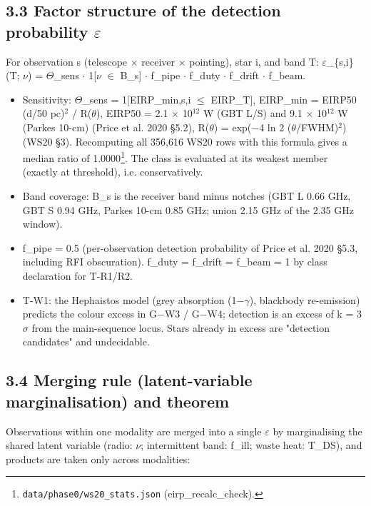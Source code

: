 \documentclass[11pt]{article}
\begin{document}
\subsection*{3.3 Factor structure of the detection probability \(\varepsilon\)}
\noindent For observation s (telescope \(\times\) receiver \(\times\) pointing), star i, and band T: \(\varepsilon\)\_\{s,i\}(T; \(\nu\)) = \(\Theta\)\_sens \(\cdot\) 1[\(\nu\) \(\in\) B\_s] \(\cdot\) f\_pipe \(\cdot\) f\_duty \(\cdot\) f\_drift \(\cdot\) f\_beam.\par\smallskip
\begin{itemize}\setlength{\itemsep}{1pt}
\item Sensitivity: \(\Theta\)\_sens = 1[EIRP\_min,s,i \(\leq\) EIRP\_T], EIRP\_min = EIRP50 (d/50 pc)\(^{2}\) / R(\(\theta\)), EIRP50 = 2.1 \(\times\) 10\(^{12}\) W (GBT L/S) and 9.1 \(\times\) 10\(^{12}\) W (Parkes 10-cm) (Price et al. 2020 \S{}5.2), R(\(\theta\)) = exp(\(-\)4 ln 2 (\(\theta\)/FWHM)\(^{2}\)) (WS20 \S{}3). Recomputing all 356,616 WS20 rows with this formula gives a median ratio of 1.0000\footnote{\texttt{data/phase0/ws20\_stats.json} (eirp\_recalc\_check).}. The class is evaluated at its weakest member (exactly at threshold), i.e. conservatively.
\item Band coverage: B\_s is the receiver band minus notches (GBT L 0.66 GHz, GBT S 0.94 GHz, Parkes 10-cm 0.85 GHz; union 2.15 GHz of the 2.35 GHz window).
\item f\_pipe = 0.5 (per-observation detection probability of Price et al. 2020 \S{}5.3, including RFI obscuration). f\_duty = f\_drift = f\_beam = 1 by class declaration for T-R1/R2.
\item T-W1: the Hephaistos model (grey absorption (1\(-\)\(\gamma\)), blackbody re-emission) predicts the colour excess in G\(-\)W3 / G\(-\)W4; detection is an excess of k = 3 \(\sigma\) from the main-sequence locus. Stars already in excess are "detection candidates" and undecidable.
\end{itemize}


\subsection*{3.4 Merging rule (latent-variable marginalisation) and theorem}
\noindent Observations within one modality are merged into a single \(\varepsilon\) by marginalising the shared latent variable (radio: \(\nu\); intermittent band: f\_ill; waste heat: T\_DS), and products are taken only across modalities:\par\smallskip
\end{document}
